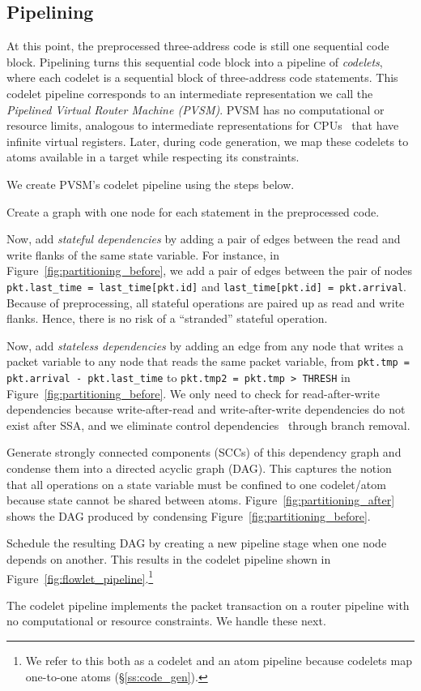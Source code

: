 \subsection{Pipelining}
\label{ss:pipelining}
At this point, the preprocessed three-address code is still one sequential code
block.  Pipelining turns this sequential code block into a pipeline of
\textit{codelets}, where each codelet is a sequential block of three-address
code statements. This codelet pipeline corresponds to an intermediate
representation we call the \textit{Pipelined Virtual Router Machine (PVSM)}.
PVSM has no computational or resource limits, analogous to intermediate
representations for CPUs~\cite{llvm} that have infinite virtual registers.
Later, during code generation, we map these codelets to atoms available in a
\absmachine target while respecting its constraints.

We create PVSM's codelet pipeline using the steps below.
\begin{CompactEnumerate}
  \item Create a graph with one node for each statement in the preprocessed code.
  \item Now, add {\em stateful dependencies} by adding a pair of edges between
the read and write flanks of the same state variable. For instance, in
Figure~\ref{fig:partitioning_before}, we add a pair of edges between the pair
of nodes {\tt pkt.last\_time = last\_time[pkt.id]} and {\tt last\_time[pkt.id]
= pkt.arrival}. Because of preprocessing, all stateful operations are paired up
as read and write flanks.  Hence, there is no risk of a ``stranded'' stateful
operation.
  \item Now, add {\em stateless dependencies} by adding an edge from any node
    that writes a packet variable to any node that reads the same packet variable,
    \eg from {\tt pkt.tmp = pkt.arrival - pkt.last\_time} to {\tt pkt.tmp2 =
    pkt.tmp > THRESH} in Figure~\ref{fig:partitioning_before}. We only need to check
    for read-after-write dependencies because
    write-after-read and write-after-write dependencies do not exist after SSA, and
    we eliminate control dependencies~\cite{ssa} through branch removal.
  \item Generate strongly connected components (SCCs) of this dependency graph
    and condense them into a directed acyclic graph (DAG). This captures the notion that all
    operations on a state variable must be confined to one codelet/atom because
    state cannot be shared between atoms. Figure~\ref{fig:partitioning_after}
    shows the DAG produced by condensing Figure~\ref{fig:partitioning_before}.
  \item Schedule the resulting DAG by creating a new pipeline stage when one
    node depends on another. This results in the codelet pipeline
    shown in Figure~\ref{fig:flowlet_pipeline}.\footnote{We refer to this both
    as a codelet and an atom pipeline because codelets map one-to-one atoms
  (\S\ref{ss:code_gen}).}
\end{CompactEnumerate}
The codelet pipeline implements the packet transaction on a router pipeline
with no computational or resource constraints. We handle these next.

